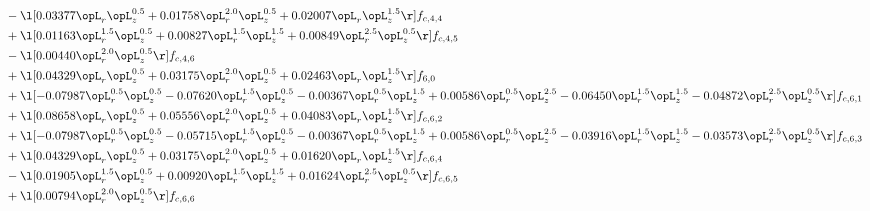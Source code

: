 \begin{alignat}{2}
& - \l[  0.03377 \opL_r \opL_z^{0.5} +  0.01758 \opL_r^{2.0} \opL_z^{0.5} +  0.02007 \opL_r \opL_z^{1.5}  \r] f_{c,4,4} \nonumber \\ 
& + \l[  0.01163 \opL_r^{1.5} \opL_z^{0.5} +  0.00827 \opL_r^{1.5} \opL_z^{1.5} +  0.00849 \opL_r^{2.5} \opL_z^{0.5}  \r] f_{c,4,5} \nonumber \\ 
& - \l[  0.00440 \opL_r^{2.0} \opL_z^{0.5}  \r] f_{c,4,6} \nonumber \\ 
& + \l[  0.04329 \opL_r \opL_z^{0.5} +  0.03175 \opL_r^{2.0} \opL_z^{0.5} +  0.02463 \opL_r \opL_z^{1.5}  \r] f_{6,0} \nonumber \\ 
& + \l[  -0.07987 \opL_r^{0.5} \opL_z^{0.5}   -0.07620 \opL_r^{1.5} \opL_z^{0.5}   -0.00367 \opL_r^{0.5} \opL_z^{1.5} +  0.00586 \opL_r^{0.5} \opL_z^{2.5}   -0.06450 \opL_r^{1.5} \opL_z^{1.5}   -0.04872 \opL_r^{2.5} \opL_z^{0.5}  \r] f_{c,6,1} \nonumber \\ 
& + \l[  0.08658 \opL_r \opL_z^{0.5} +  0.05556 \opL_r^{2.0} \opL_z^{0.5} +  0.04083 \opL_r \opL_z^{1.5}  \r] f_{c,6,2} \nonumber \\ 
& + \l[  -0.07987 \opL_r^{0.5} \opL_z^{0.5}   -0.05715 \opL_r^{1.5} \opL_z^{0.5}   -0.00367 \opL_r^{0.5} \opL_z^{1.5} +  0.00586 \opL_r^{0.5} \opL_z^{2.5}   -0.03916 \opL_r^{1.5} \opL_z^{1.5}   -0.03573 \opL_r^{2.5} \opL_z^{0.5}  \r] f_{c,6,3} \nonumber \\ 
& + \l[  0.04329 \opL_r \opL_z^{0.5} +  0.03175 \opL_r^{2.0} \opL_z^{0.5} +  0.01620 \opL_r \opL_z^{1.5}  \r] f_{c,6,4} \nonumber \\ 
& - \l[  0.01905 \opL_r^{1.5} \opL_z^{0.5} +  0.00920 \opL_r^{1.5} \opL_z^{1.5} +  0.01624 \opL_r^{2.5} \opL_z^{0.5}  \r] f_{c,6,5} \nonumber \\ 
& + \l[  0.00794 \opL_r^{2.0} \opL_z^{0.5}  \r] f_{c,6,6} \nonumber \\ 
\end{alignat} 


